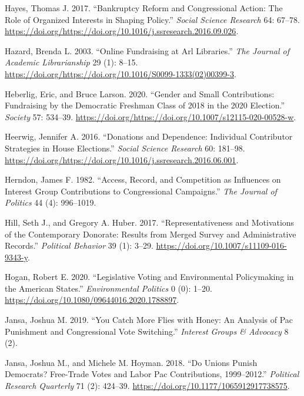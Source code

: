 \documentclass[12pt,]{article}
\begin{document}
\leavevmode\hypertarget{ref-hayes2017}{}%
Hayes, Thomas J. 2017. ``Bankruptcy Reform and Congressional Action: The
Role of Organized Interests in Shaping Policy.'' \emph{Social Science
Research} 64: 67--78.
\url{https://doi.org/https://doi.org/10.1016/j.ssresearch.2016.09.026}.

\leavevmode\hypertarget{ref-hazard2003}{}%
Hazard, Brenda L. 2003. ``Online Fundraising at Arl Libraries.''
\emph{The Journal of Academic Librarianship} 29 (1): 8--15.
\url{https://doi.org/https://doi.org/10.1016/S0099-1333(02)00399-3}.

\leavevmode\hypertarget{ref-heberlig2020}{}%
Heberlig, Eric, and Bruce Larson. 2020. ``Gender and Small
Contributions: Fundraising by the Democratic Freshman Class of 2018 in
the 2020 Election.'' \emph{Society} 57: 534--39.
\url{https://doi.org/https://doi.org/10.1007/s12115-020-00528-w}.

\leavevmode\hypertarget{ref-heerwig2016}{}%
Heerwig, Jennifer A. 2016. ``Donations and Dependence: Individual
Contributor Strategies in House Elections.'' \emph{Social Science
Research} 60: 181--98.
\url{https://doi.org/https://doi.org/10.1016/j.ssresearch.2016.06.001}.

\leavevmode\hypertarget{ref-herndon1982}{}%
Herndon, James F. 1982. ``Access, Record, and Competition as Influences
on Interest Group Contributions to Congressional Campaigns.'' \emph{The
Journal of Politics} 44 (4): 996--1019.

\leavevmode\hypertarget{ref-hill2017}{}%
Hill, Seth J., and Gregory A. Huber. 2017. ``Representativeness and
Motivations of the Contemporary Donorate: Results from Merged Survey and
Administrative Records.'' \emph{Political Behavior} 39 (1): 3--29.
\url{https://doi.org/10.1007/s11109-016-9343-y}.

\leavevmode\hypertarget{ref-hogan2020}{}%
Hogan, Robert E. 2020. ``Legislative Voting and Environmental
Policymaking in the American States.'' \emph{Environmental Politics} 0
(0): 1--20. \url{https://doi.org/10.1080/09644016.2020.1788897}.

\leavevmode\hypertarget{ref-jansa2019}{}%
Jansa, Joshua M. 2019. ``You Catch More Flies with Honey: An Analysis of
Pac Punishment and Congressional Vote Switching.'' \emph{Interest Groups
\& Advocacy} 8 (2).

\leavevmode\hypertarget{ref-jansa2018}{}%
Jansa, Joshua M., and Michele M. Hoyman. 2018. ``Do Unions Punish
Democrats? Free-Trade Votes and Labor Pac Contributions, 1999--2012.''
\emph{Political Research Quarterly} 71 (2): 424--39.
\url{https://doi.org/10.1177/1065912917738575}.
\end{document}
